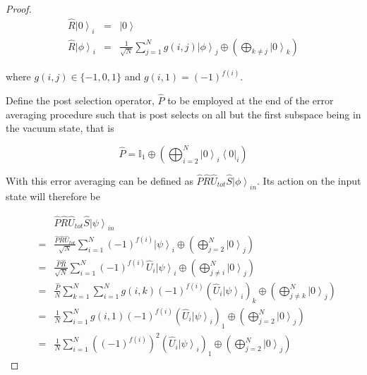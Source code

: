 \documentclass[aps,pra,twocolumn,superscriptaddress,numerical]{revtex4-1}
\begin{document}
\begin{proof}
		\begin{eqnarray}
			\hat{R}\left|0\right\rangle_{i} &=& \left|0\right\rangle \\
			\hat{R}\left|\phi\right\rangle_{i} &=& \frac{1}{\sqrt{N}}\sum_{j=1}^{N} g\left(i,j\right)\left|\phi\right\rangle_{j}\oplus\left(\bigoplus_{k\ne j}\left|0\right\rangle_{k}\right) 
		\end{eqnarray}
		
		where $g\left(i,j\right)\in\{-1,0,1\}$ and $g\left(i,1\right)=\left(-1\right)^{f\left(i\right)}$.
		
		Define the post selection operator, $\hat{P}$ to be employed at the end of the error averaging procedure such that is post selects on all but the first subspace being in the vacuum state, that is
		
		\begin{equation}
			\hat{P}=\mathbb{I}_{1}\oplus\left(\bigoplus_{i=2}^{N}\left|0\right\rangle_{i}\left\langle 0\right|_{i}\right)
		\end{equation}
		
		With this error averaging can be defined as $\hat{P}\hat{R}\hat{U}_{tot}\hat{S}\left|\phi\right\rangle_{in}$. Its action on the input state will therefore be
		
		\begin{eqnarray}
			& & \hat{P}\hat{R}\hat{U}_{tot}\hat{S}\left|\psi\right\rangle_{in} \\
			&=& \frac{\hat{P}\hat{R}\hat{U}_{tot}}{\sqrt{N}}\sum_{i=1}^{N}(-1)^{f\left(i\right)}\left|\psi\right\rangle_{i}\oplus\left(\bigoplus_{j=2}^{N}\left|0\right\rangle_{j}\right) \\
			&=& \frac{\hat{P}\hat{R}}{\sqrt{N}}\sum_{i=1}^{N}(-1)^{f\left(i\right)}\hat{U}_{i}\left|\psi\right\rangle_{i}\oplus\left(\bigoplus_{j\ne i}^{N}\left|0\right\rangle_{j}\right) \\
			&=& \frac{\hat{P}}{N}\sum_{k=1}^{N}\sum_{i=1}^{N}g\left(i,k\right)(-1)^{f\left(i\right)}\left(\hat{U}_{i}\left|\psi\right\rangle_{i}\right)_{k}\oplus\left(\bigoplus_{j\ne k}^{N}\left|0\right\rangle_{j}\right) \\
			&=& \frac{1}{N}\sum_{i=1}^{N}g\left(i,1\right)(-1)^{f\left(i\right)}\left(\hat{U}_{i}\left|\psi\right\rangle_{i}\right)_{1}\oplus\left(\bigoplus_{j=2}^{N}\left|0\right\rangle_{j}\right) \\
			&=& \frac{1}{N}\sum_{i=1}^{N}\left((-1)^{f\left(i\right)}\right)^{2}\left(\hat{U}_{i}\left|\psi\right\rangle_{i}\right)_{1}\oplus\left(\bigoplus_{j=2}^{N}\left|0\right\rangle_{j}\right) 
		\end{eqnarray}
		

\end{proof}
\end{document}

